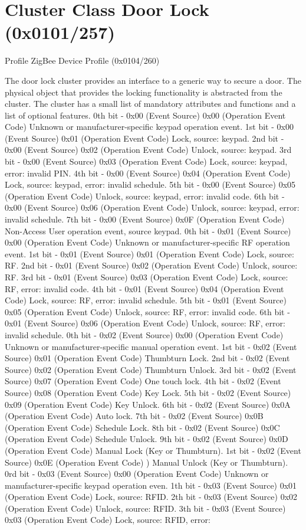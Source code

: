 \section{Cluster Class Door Lock (0x0101/257)}

Profile ZigBee Device Profile (0x0104/260)

The door lock cluster provides an interface to a generic way to secure a door. The physical object that provides the locking functionality is abstracted from the cluster. The cluster has a small list of mandatory attributes and functions and a list of optional features. 0th bit - 0x00 (Event Source) 0x00 (Operation Event Code) Unknown or manufacturer-specific keypad operation event. 1st bit - 0x00 (Event Source) 0x01 (Operation Event Code) Lock, source: keypad. 2nd bit - 0x00 (Event Source) 0x02 (Operation Event Code) Unlock, source: keypad. 3rd bit - 0x00 (Event Source) 0x03 (Operation Event Code) Lock, source: keypad, error: invalid PIN. 4th bit - 0x00 (Event Source) 0x04 (Operation Event Code) Lock, source: keypad, error: invalid schedule. 5th bit - 0x00 (Event Source) 0x05 (Operation Event Code) Unlock, source: keypad, error: invalid code. 6th bit - 0x00 (Event Source) 0x06 (Operation Event Code) Unlock, source: keypad, error: invalid schedule. 7th bit - 0x00 (Event Source) 0x0F (Operation Event Code) Non-Access User operation event, source keypad. 0th bit - 0x01 (Event Source) 0x00 (Operation Event Code)  Unknown or manufacturer-specific RF operation event. 1st bit - 0x01 (Event Source) 0x01 (Operation Event Code)  Lock, source: RF. 2nd bit - 0x01 (Event Source) 0x02 (Operation Event Code)  Unlock, source: RF. 3rd bit - 0x01 (Event Source) 0x03 (Operation Event Code)  Lock, source: RF, error: invalid code. 4th bit - 0x01 (Event Source) 0x04 (Operation Event Code)  Lock, source: RF, error: invalid schedule. 5th bit - 0x01 (Event Source) 0x05 (Operation Event Code)  Unlock, source: RF, error: invalid code. 6th bit - 0x01 (Event Source) 0x06 (Operation Event Code)  Unlock, source: RF, error: invalid schedule. 0th bit - 0x02 (Event Source) 0x00 (Operation Event Code)  Unknown or manufacturer-specific manual operation event. 1st bit - 0x02 (Event Source) 0x01 (Operation Event Code)  Thumbturn Lock. 2nd bit - 0x02 (Event Source) 0x02 (Operation Event Code)  Thumbturn Unlock. 3rd bit - 0x02 (Event Source) 0x07 (Operation Event Code)  One touch lock. 4th bit - 0x02 (Event Source) 0x08 (Operation Event Code)  Key Lock. 5th bit - 0x02 (Event Source) 0x09 (Operation Event Code)  Key Unlock. 6th bit - 0x02 (Event Source) 0x0A (Operation Event Code)  Auto lock. 7th bit - 0x02 (Event Source) 0x0B (Operation Event Code)  Schedule Lock. 8th bit - 0x02 (Event Source) 0x0C (Operation Event Code)  Schedule Unlock. 9th bit - 0x02 (Event Source) 0x0D (Operation Event Code)  Manual Lock (Key or Thumbturn). 1st bit - 0x02 (Event Source) 0x0E (Operation Event Code) ) Manual Unlock (Key or Thumbturn). 0rd bit - 0x03 (Event Source) 0x00 (Operation Event Code)  Unknown or manufacturer-specific keypad operation even. 1th bit - 0x03 (Event Source) 0x01 (Operation Event Code)  Lock, source: RFID. 2th bit - 0x03 (Event Source) 0x02 (Operation Event Code)  Unlock, source: RFID. 3th bit - 0x03 (Event Source) 0x03 (Operation Event Code)  Lock, source: RFID, error: 